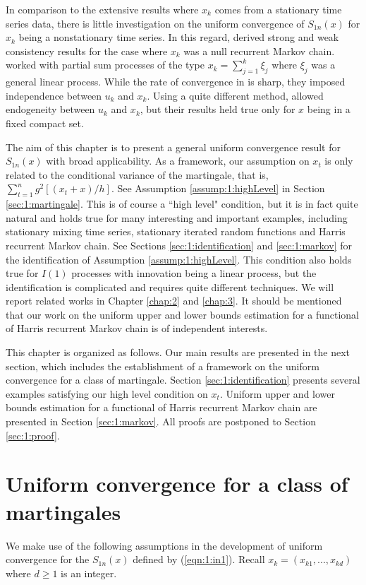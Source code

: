 In comparison to the extensive results where $x_k$ comes from a stationary time series data, there is little investigation on the uniform convergence of $S_{1n}(x)$ for $x_k$ being a nonstationary time series. In this regard, \cite{gaolitjostheim2011} derived strong and weak consistency results for the case where $x_k$ was a null recurrent Markov chain. \cite{wangwang2012} worked  with partial sum processes of the type $x_k=\sum_{j=1}^k\xi_j$ where $\xi_j$ was a general linear process. While the rate of convergence   in \cite{gaolitjostheim2011} is sharp,  they imposed independence between $u_k$ and $x_k$. Using a quite different method, \cite{wangwang2012} allowed endogeneity between $u_k$ and $x_k$, but their results held true only for $x$ being in a fixed compact set.

The aim of this chapter is to present a general uniform convergence result for $S_{1n}(x)$ with broad applicability. As a framework,  our  assumption on $x_t$ is only related to the conditional variance of the  martingale, that is, $ \sum_{t=1}^n g^2[(x_t+x)/h]$. See Assumption \ref{assump:1:highLevel} in Section \ref{sec:1:martingale}.
This is of course a ``high level" condition, but it is in fact quite natural and holds true for many interesting and important examples, including stationary mixing time series, stationary  iterated random functions and Harris  recurrent Markov chain. See Sections \ref{sec:1:identification} and \ref{sec:1:markov} for the identification of Assumption \ref{assump:1:highLevel}. This condition also holds true for $I(1)$ processes with innovation being a linear process, but the identification is complicated and requires quite different techniques. We will report related works in Chapter \ref{chap:2} and \ref{chap:3}. It should be mentioned that our work on the uniform upper and lower  bounds estimation for a functional of Harris recurrent Markov chain is of independent interests.


This chapter is organized as follows. Our main results are presented in the next section, which includes the establishment of a framework on the uniform convergence for a class of martingale. Section \ref{sec:1:identification} presents several examples satisfying our high level condition on $x_t$. Uniform upper and lower  bounds estimation for a functional of Harris recurrent Markov chain are presented in Section \ref{sec:1:markov}. All proofs are postponed to Section \ref{sec:1:proof}. 


\section{Uniform convergence for a class of martingales} 
We make use of the following assumptions in the development of  uniform convergence for the $S_{1n}(x)$ defined by (\ref {eqn:1:in1}).
Recall $x_k=(x_{k1},..., x_{kd})$ where $ d\ge 1$ is an integer.

